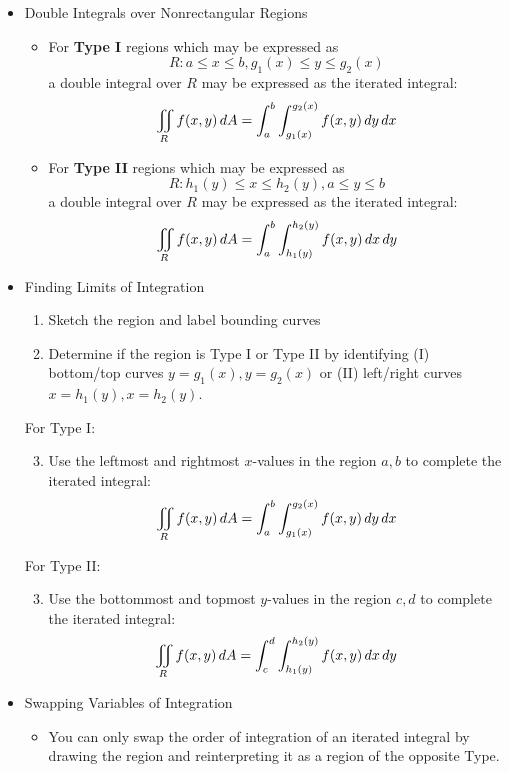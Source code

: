   \begin{itemize}
  
  \item Double Integrals over Nonrectangular Regions
  
    \begin{itemize}
    \item For \textbf{Type I} regions which may be expressed as \[R: a\leq x\leq b, g_1(x)\leq y\leq g_2(x)\] a double integral over $R$ may be expressed as the iterated integral:
      \[
        \iint_R f(x,y)\,d{A} = \int_a^b\int_{g_1(x)}^{g_2(x)} f(x,y)\,d{y}\,d{x}
      \]
    \item For \textbf{Type II} regions which may be expressed as \[R: h_1(y)\leq x\leq h_2(y), a\leq y\leq b\] a double integral over $R$ may be expressed as the iterated integral:
      \[
        \iint_R f(x,y)\,d{A} = \int_a^b\int_{h_1(y)}^{h_2(y)} f(x,y)\,d{x}\,d{y}
      \]
    \end{itemize}

  \item Finding Limits of Integration
      \begin{enumerate}
      \item Sketch the region and label bounding curves
      \item Determine if the region is Type I or Type II by identifying (I) bottom/top curves $y=g_1(x),y=g_2(x)$ or (II) left/right curves $x=h_1(y),x=h_2(y)$.
      \end{enumerate}
      For Type I:
      \begin{enumerate}
      \setcounter{enumi}{2}
      \item Use the leftmost and rightmost $x$-values in the region $a,b$ to complete the iterated integral:
        \[
          \iint_R f(x,y)\,d{A} = \int_a^b\int_{g_1(x)}^{g_2(x)}f(x,y)\,d{y}\,d{x}
        \]
      \end{enumerate}
      For Type II:
      \begin{enumerate}
      \setcounter{enumi}{2}
      \item Use the bottommost and topmost $y$-values in the region $c,d$ to complete the iterated integral:
        \[
          \iint_R f(x,y)\,d{A} = \int_c^d\int_{h_1(y)}^{h_2(y)}f(x,y)\,d{x}\,d{y}
        \]
      \end{enumerate}
  
  \item Swapping Variables of Integration
  
    \begin{itemize}
    \item You can only swap the order of integration of an iterated integral by drawing the region and reinterpreting it as a region of the opposite Type.
    \end{itemize}


\end{itemize}
